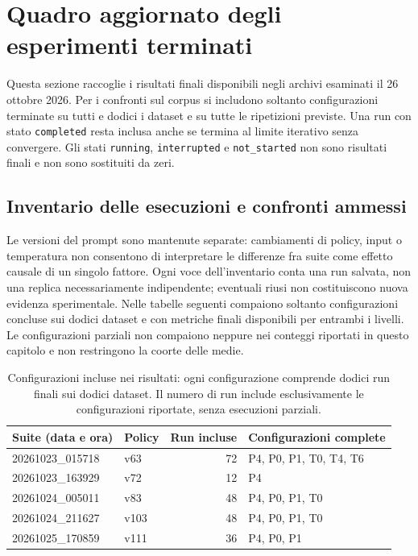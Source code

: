\section{Quadro aggiornato degli esperimenti terminati}
\label{sec:completed-experiments-overview}
Questa sezione raccoglie i risultati finali disponibili negli archivi
esaminati il 26 ottobre 2026. Per i confronti sul corpus si includono
soltanto configurazioni terminate su tutti e dodici i dataset e su tutte
le ripetizioni previste. Una run con stato \texttt{completed} resta
inclusa anche se termina al limite iterativo senza convergere.
Gli stati \texttt{running}, \texttt{interrupted} e \texttt{not\_started}
non sono risultati finali e non sono sostituiti da zeri.

\subsection{Inventario delle esecuzioni e confronti ammessi}
Le versioni del prompt sono mantenute separate: cambiamenti di policy,
input o temperatura non consentono di interpretare le differenze fra
suite come effetto causale di un singolo fattore. Ogni voce dell'inventario
conta una run salvata, non una replica necessariamente indipendente;
eventuali riusi non costituiscono nuova evidenza sperimentale.
Nelle tabelle seguenti compaiono soltanto configurazioni concluse sui
dodici dataset e con metriche finali disponibili per entrambi i livelli.
Le configurazioni parziali non compaiono neppure nei conteggi riportati
in questo capitolo e non restringono la coorte delle medie.
\begin{table}[htbp]
\centering\small
\caption{Configurazioni incluse nei risultati: ogni configurazione comprende dodici run finali sui dodici dataset. Il numero di run include esclusivamente le configurazioni riportate, senza esecuzioni parziali.}\label{tab:completed-suite-inventory}
\begin{tabular}{llrl}
\toprule
Suite (data e ora) & Policy & Run incluse & Configurazioni complete \\
\midrule
20261023\_015718 & v63 & 72 & P4, P0, P1, T0, T4, T6 \\
20261023\_163929 & v72 & 12 & P4 \\
20261024\_005011 & v83 & 48 & P4, P0, P1, T0 \\
20261024\_211627 & v103 & 48 & P4, P0, P1, T0 \\
20261025\_170859 & v111 & 36 & P4, P0, P1 \\
\bottomrule
\end{tabular}
\end{table}
